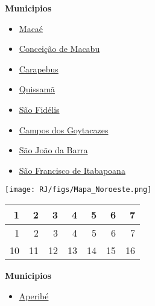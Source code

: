 \documentclass[10pt]{article} %
\begin{document}
\begin{minipage}[t]{.66\linewidth}
\end{minipage}\hfill\begin{minipage}[t]{.30\linewidth}
\begin{mdframed}[style=sidebar,frametitle={}]
\textbf{Municipios}\begin{itemize}\item \hyperlink{https:/alerta.dengue.mat.br/alerta/3302403}{Macaé}
\item \hyperlink{https:/alerta.dengue.mat.br/alerta/3301405}{Conceição de Macabu}
\item \hyperlink{https:/alerta.dengue.mat.br/alerta/3300936}{Carapebus}
\item \hyperlink{https:/alerta.dengue.mat.br/alerta/3304151}{Quissamã}
\item \hyperlink{https:/alerta.dengue.mat.br/alerta/3304805}{São Fidélis}
\item \hyperlink{https:/alerta.dengue.mat.br/alerta/3301009}{Campos dos Goytacazes}
\item \hyperlink{https:/alerta.dengue.mat.br/alerta/3305000}{São João da Barra}
\item \hyperlink{https:/alerta.dengue.mat.br/alerta/3304755}{São Francisco de Itabapoana}
\end{itemize}\end{mdframed}\hfill\end{minipage}\newpage\begin{minipage}[t]{.66\linewidth}
\hypertarget{ Nrst }{}
\texttt{[image: RJ/figs/Mapa\_Noroeste.png]}\vspace{0.5cm}\begin{center}
\begin{tabular}{rrrrrrr}
  \hline
1 & 2 & 3 & 4 & 5 & 6 & 7 \\ 
  \hline
  1 &   2 &   3 &   4 &   5 &   6 &   7 \\ 
   10 &  11 &  12 &  13 &  14 &  15 &  16 \\ 
   \hline
\end{tabular}
\end{center}
\end{minipage}\hfill\begin{minipage}[t]{.30\linewidth}
\begin{mdframed}[style=sidebar,frametitle={}]
\textbf{Municipios}\begin{itemize}\item \hyperlink{https:/alerta.dengue.mat.br/alerta/3300159}{Aperibé}

\end{itemize}
\end{mdframed}
\end{minipage}
\end{document}
